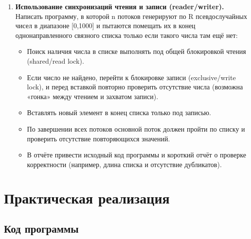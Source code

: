 \documentclass[a4paper, 14pt]{extarticle}
\begin{document}
\begin{enumerate}
    \item \textbf{Использование синхронизаций чтения и записи (reader/writer).}\\
        Написать программу, в которой n потоков генерируют по R псевдослучайных чисел в диапазоне [0,1000] и пытаются помещать их в конец однонаправленного связного списка только если такого числа там ещё нет:
        \begin{itemize}
            \item Поиск наличия числа в списке выполнять под общей блокировкой чтения (shared/read lock).
            \item Если число не найдено, перейти к блокировке записи (exclusive/write lock), и перед вставкой повторно проверить отсутствие числа (возможна «гонка» между чтением и захватом записи).
            \item Вставлять новый элемент в конец списка только под записью.
            \item По завершении всех потоков основной поток должен пройти по списку и проверить отсутствие повторяющихся значений.
            \item В отчёте привести исходный код программы и короткий отчёт о проверке корректности (например, длина списка и отсутствие дубликатов).
        \end{itemize}
\end{enumerate}

\section*{Практическая реализация}\label{Sect::implementation}

\subsection*{Код программы}\label{Subsect::source_code}
\end{document}

